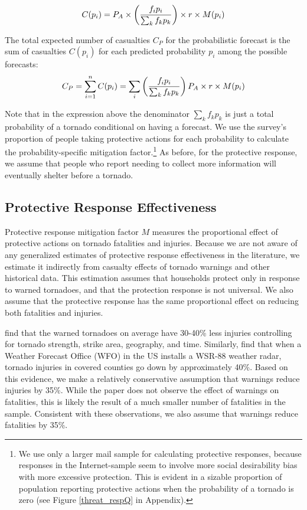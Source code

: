 \documentclass{ametsocV6.1}
\begin{document}
\begin{equation}
C(p_i) = P_A \times \left({f_i p_i\over \sum_k f_k p_k}\right)  \times r \times M(p_i)
\end{equation}

The total expected number of casualties $C_P$ for the probabilistic forecast is the sum of casualties $C(p_i)$ for each predicted probability $p_i$ among the possible forecasts:
\begin{equation}
C_P=\sum_{i=1}^n C(p_i)=\sum_i \left({f_i p_i\over \sum_k f_k p_k}\right) P_A \times r  \times M(p_i)
\end{equation}

Note that in the expression above the denominator $\sum_k f_k p_k$ is just a total probability of a tornado conditional on having a forecast. We use the survey's proportion of people taking protective actions for each probability to calculate the probability-specific mitigation factor.\footnote{We use only a larger mail sample for calculating protective responses, because responses in the Internet-sample seem to involve more social desirability bias with more excessive protection. This is evident in a sizable proportion of population reporting protective actions when the probability of a tornado is zero (see Figure \ref{threat_respQ} in Appendix). } As before, for the protective response, we assume that people who report needing to collect more information will eventually shelter before a tornado. 

\vspace{10pt}
\subsection{Protective Response Effectiveness} 
Protective response mitigation factor $M$ measures the proportional effect of protective actions on tornado fatalities and injuries. Because we are not aware of any generalized estimates of protective response effectiveness in the literature, we estimate it indirectly from casualty effects of tornado warnings and other historical data. This estimation assumes that households protect only in response to warned tornadoes, and that the protection response is not universal. We also assume that the protective response has the same proportional effect on reducing both fatalities and injuries.

\citet{simmons_false_2009} find that the warned tornadoes on average have 30-40\% less injuries controlling for tornado strength, strike area, geography, and time. Similarly, \citet{simmons_wsr-88d_2005} find that when a Weather Forecast Office (WFO) in the US installs a WSR-88 weather radar, tornado injuries in covered counties go down by approximately 40\%. Based on this evidence, we make a relatively conservative assumption that warnings reduce injuries by 35\%. While the paper does not observe the effect of warnings on fatalities, this is likely the result of a much smaller number of fatalities in the sample. Consistent with these observations, we also assume that warnings reduce fatalities by 35\%.
\end{document}
